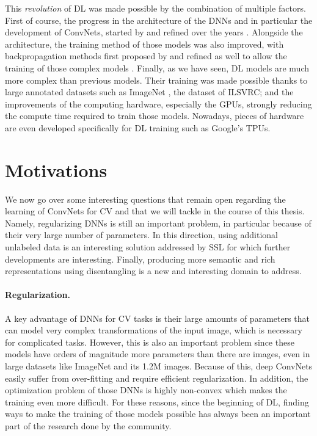 This \textit{revolution} of \acf{DL} was made possible by the combination of multiple factors. First of course, the progress in the architecture of the \acp{DNN} and in particular the development of \acfp{ConvNet}, started by \citet{nakamura} and refined over the years \citep{lecun1989backpropagation,alexnet,resnet}.
 Alongside the architecture, the training method of those models was also improved, with backpropagation methods first proposed by \citet{rumelhart1988learning,lecun} and refined as well to allow the training of those complex models \citep{dropout,batchnorm}. Finally, as we have seen, \ac{DL} models are much more complex than previous models. Their training was made possible thanks to large annotated datasets such as ImageNet \citep{imagenet}, the dataset of \ac{ILSVRC}; and the improvements of the computing hardware, especially the \acp{GPU}, strongly reducing the compute time required to train those models. Nowadays, pieces of hardware are even developed specifically for \ac{DL} training such as Google's \acp{TPU}.


\section{Motivations}

We now go over some interesting questions that remain open regarding the learning of \acp{ConvNet} for \acf{CV} and that we will tackle in the course of this thesis. Namely, regularizing \acp{DNN} is still an important problem, in particular because of their very large number of parameters. In this direction, using additional unlabeled data is an interesting solution addressed by \ac{SSL} for which further developments are interesting. Finally, producing more semantic and rich representations using disentangling is a new and interesting domain to address.

\paragraph{Regularization.} A key advantage of \acp{DNN} for \ac{CV} tasks is their large amounts of parameters that can model very complex transformations of the input image, which is necessary for complicated tasks. However, this is also an important problem since these models have orders of magnitude more parameters than there are images, even in large datasets like ImageNet and its 1.2M images. Because of this, deep \acp{ConvNet} easily suffer from over-fitting and require efficient regularization. In addition, the optimization problem of those \acp{DNN} is highly non-convex \citep{kawaguchi2016deep} which makes the training even more difficult. For these reasons, since the beginning of \ac{DL}, finding ways to make the training of those models possible has always been an important part of the research done by the community.


